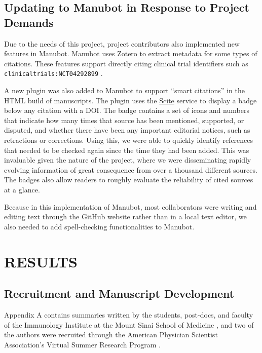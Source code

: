 \documentclass[sigconf]{acmart}
\begin{document}
\hypertarget{updating-to-manubot-in-response-to-project-demands}{%
\subsection{Updating to Manubot in Response to Project Demands}\label{updating-to-manubot-in-response-to-project-demands}}

Due to the needs of this project, project contributors also implemented new features in Manubot.
Manubot uses Zotero \citep{snhvVGmP} to extract metadata for some types of citations.
These features support directly citing clinical trial identifiers such as \texttt{clinicaltrials:NCT04292899} \citep{yTCAmOyt}.

A new plugin was also added to Manubot to support ``smart citations'' in the HTML build of manuscripts.
The plugin uses the \href{https://scite.ai/}{Scite} service to display a badge below any citation with a DOI.
The badge contains a set of icons and numbers that indicate how many times that source has been mentioned, supported, or disputed, and whether there have been any important editorial notices, such as retractions or corrections.
Using this, we were able to quickly identify references that needed to be checked again since the time they had been added.
This was invaluable given the nature of the project, where we were disseminating rapidly evolving information of great consequence from over a thousand different sources.
The badges also allow readers to roughly evaluate the reliability of cited sources at a glance.

Because in this implementation of Manubot, most collaborators were writing and editing text through the GitHub website rather than in a local text editor, we also needed to add spell-checking functionalities to Manubot.

\hypertarget{results}{%
\section{RESULTS}\label{results}}

\hypertarget{recruitment-and-manuscript-development}{%
\subsection{Recruitment and Manuscript Development}\label{recruitment-and-manuscript-development}}

Appendix A contains summaries written by the students, post-docs, and faculty of the Immunology Institute at the Mount Sinai School of Medicine \citep{cYo4O2qX, YZ4cHNuH}, and two of the authors were recruited through the American Physician Scientist Association's Virtual Summer Research Program \citep{DGTDsJZy}.
\end{document}
